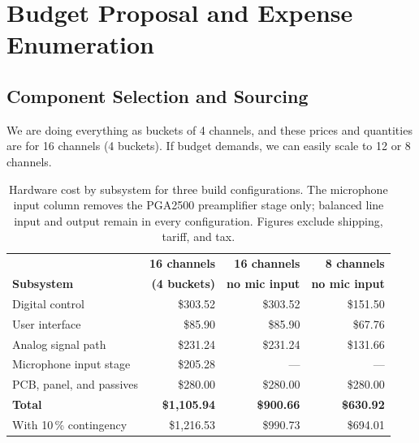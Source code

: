 \documentclass[11pt, letterpaper,titlepage]{article}
\begin{document}
\newpage
\section{Budget Proposal and Expense Enumeration}

\subsection{Component Selection and Sourcing}

We are doing everything as buckets of 4 channels, and these prices and quantities are for 16 channels (4 buckets). If budget demands, we can easily scale to 12 or 8 channels.






\begin{table}[H]
\centering
\caption{Hardware cost by subsystem for three build configurations. The
microphone input column removes the PGA2500 preamplifier stage only; balanced
line input and output remain in every configuration. Figures exclude shipping,
tariff, and tax.}
\label{tab:budget-summary}
\begin{tabular}{l r r r}
\toprule
 & \textbf{16 channels} & \textbf{16 channels} & \textbf{8 channels} \\
\textbf{Subsystem} & \textbf{(4 buckets)} & \textbf{no mic input} & \textbf{no mic input} \\
\midrule
Digital control            & \$303.52 & \$303.52 & \$151.50 \\
User interface             & \$85.90  & \$85.90  & \$67.76 \\
Analog signal path         & \$231.24 & \$231.24 & \$131.66 \\
Microphone input stage     & \$205.28 & ---      & --- \\
PCB, panel, and passives   & \$280.00 & \$280.00 & \$280.00 \\
\midrule
\textbf{Total}             & \textbf{\$1{,}105.94} & \textbf{\$900.66} & \textbf{\$630.92} \\
With 10\,\% contingency    & \$1{,}216.53 & \$990.73 & \$694.01 \\
\bottomrule
\end{tabular}
\end{table}
\end{document}
